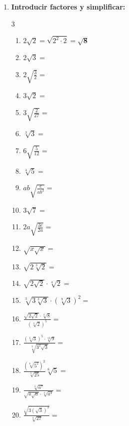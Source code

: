 \documentclass[10pt, a4paper]{article}
\begin{document}
\begin{enumerate}
    \item \textbf{Introducir factores y simplificar:}
    \begin{multicol}{3}
    \begin{enumerate}[label=\alph*)]
        \item $2\sqrt{2} = \sqrt{2^2 \cdot 2} = \mathbf{\sqrt{8}}$
        \item $2\sqrt{3} =$
        \item $2\sqrt{\frac{3}{2}} =$
        \item $3\sqrt{2} =$
        \item $3\sqrt{\frac{2}{27}} =$
        \item $\sqrt[3]{3} =$
        \item $6\sqrt{\frac{5}{12}} =$
        \item $\sqrt[4]{5} =$
        \item $ab\sqrt{\frac{c}{a b^3}} =$
        \item $3\sqrt{7} =$
        \item $2a\sqrt{\frac{3c}{2a}} =$
        \item $\sqrt{x\sqrt{x}} =$
        \item $\sqrt{2\sqrt[3]{2}} =$
        \item $\sqrt{2\sqrt{2}}\cdot\sqrt[4]{2} =$
        \item $\sqrt[3]{3\sqrt[3]{3}}\cdot(\sqrt[9]{3})^2 =$
        \item $\frac{\sqrt{2\sqrt{2}}\cdot\sqrt[4]{8}}{(\sqrt[4]{2})^5} =$
        \item $\frac{(\sqrt[6]{3})^5\cdot\sqrt[12]{9}}{\sqrt[3]{3^2 \sqrt{3}}} =$
        \item $\frac{(\sqrt[6]{5^2})^2}{\sqrt[3]{25}}\sqrt[6]{5} =$
        \item $\frac{\sqrt[4]{a^7}}{\sqrt{a\sqrt{a}}\cdot\sqrt[4]{a^3}} =$
        \item $\frac{\sqrt{3(\sqrt{3})^3}}{\sqrt[4]{27}} =$
    \end{enumerate}
    \end{multicol}


\end{enumerate}
\end{document}
